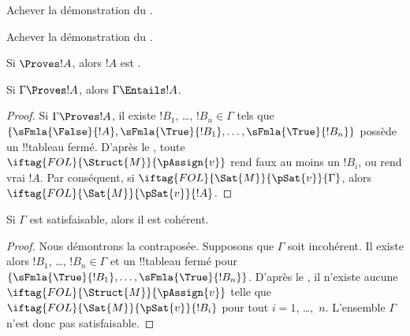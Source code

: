 \documentclass[../../../include/open-logic-section]{subfiles}
\begin{document}
%
%
%
%
%
%
%
%

\begin{prob}
Achever la démonstration du
.
\end{prob}
\tagendprob

\begin{prob}
Achever la démonstration du
.
\end{prob}
\tagendprob

\begin{cor}
Si $\Proves !A$, alors $!A$ est .
\end{cor}

\begin{cor}
Si $\Gamma \Proves !A$, alors $\Gamma \Entails !A$.
\end{cor}

\begin{proof}
  Si $\Gamma \Proves !A$, il existe $!B_1$, \dots, $!B_n \in
  \Gamma$ tels que $\{\sFmla{\False}{!A},
  \sFmla{\True}{!B_1}, \dots, \sFmla{\True}{!B_n}\}$ possède un
  !!{tableau} fermé. D'après le
  , toute
  ~$\iftag{FOL}{\Struct{M}}{\pAssign{v}}$
  rend faux au moins un $!B_i$, ou rend vrai $!A$. Par conséquent, si
  $\iftag{FOL}{\Sat{M}}{\pSat{v}}{\Gamma}$, alors
  $\iftag{FOL}{\Sat{M}}{\pSat{v}}{!A}$.
\end{proof}

\begin{cor}
Si $\Gamma$ est satisfaisable, alors il est cohérent.
\end{cor}

\begin{proof}
Nous démontrons la contraposée. Supposons que $\Gamma$ soit
incohérent. Il existe alors $!B_1$, \dots, $!B_n \in \Gamma$ et un
!!{tableau} fermé pour
$\{\sFmla{\True}{!B_1}, \dots, \sFmla{\True}{!B_n}\}$. D'après le
, il n'existe aucune
$\iftag{FOL}{\Struct{M}}{\pAssign{v}}$ telle que
$\iftag{FOL}{\Sat{M}}{\pSat{v}}{!B_i}$ pour tout
$i=1$, \dots,~$n$. L'ensemble $\Gamma$ n'est donc pas satisfaisable.
\end{proof}
\end{document}
